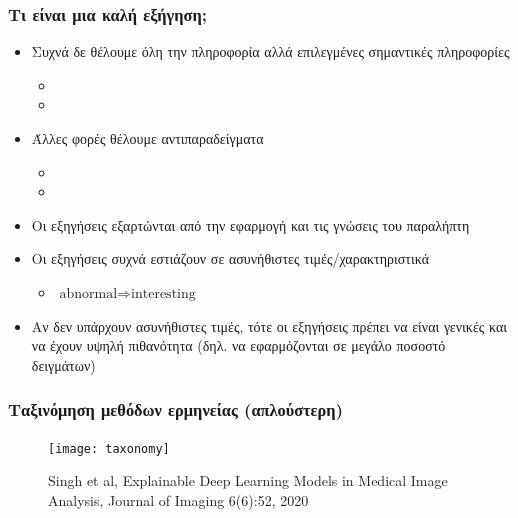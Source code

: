 \begin{frame}
  \frametitle{Τι είναι μια καλή εξήγηση;}
  \begin{itemize}
  \item Συχνά δε θέλουμε όλη την πληροφορία αλλά επιλεγμένες σημαντικές
    πληροφορίες
    \begin{itemize}
    \item {}
    \item {}
    \end{itemize}
  \item Άλλες φορές θέλουμε αντιπαραδείγματα
    \begin{itemize}
    \item {}
    \item {}
    \end{itemize}
  \item Οι εξηγήσεις εξαρτώνται από την εφαρμογή και τις γνώσεις του παραλήπτη
  \item Οι εξηγήσεις συχνά εστιάζουν σε ασυνήθιστες τιμές/χαρακτηριστικά
    \begin{itemize}
    \item $\text{abnormal} \Rightarrow \text{interesting}$
    \end{itemize}
  \item Αν δεν υπάρχουν ασυνήθιστες τιμές, τότε οι εξηγήσεις πρέπει να είναι
    γενικές και να έχουν υψηλή πιθανότητα (δηλ. να εφαρμόζονται σε μεγάλο
    ποσοστό δειγμάτων)
  \end{itemize}
\end{frame}


\begin{frame}
  \frametitle{Ταξινόμηση μεθόδων ερμηνείας (απλούστερη)}
  \begin{figure}
    \texttt{[image: taxonomy]}
    \caption{\footnotesize Singh et al, Explainable Deep Learning Models in Medical Image
      Analysis, Journal of Imaging 6(6):52, 2020}
  \end{figure}
\end{frame}


